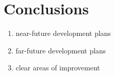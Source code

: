 
\section{Conclusions}

\begin{enumerate}
\item near-future development plans
\item far-future development plans
\item clear areas of improvement
\end{enumerate}



